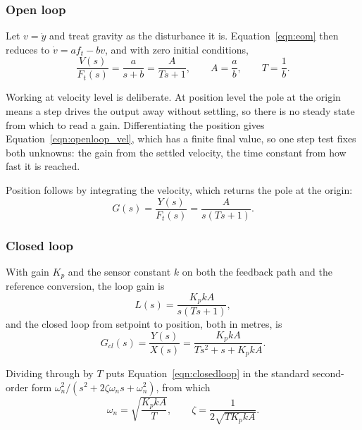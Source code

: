 \subsubsection{Open loop}
Let $v = \dot{y}$ and treat gravity as the disturbance it is. Equation~\eqref{eqn:eom} then
reduces to $\dot{v} = a f_t - b v$, and with zero initial conditions,
\begin{equation}\label{eqn:openloop_vel}
    \frac{V(s)}{F_t(s)} = \frac{a}{s + b} = \frac{A}{Ts + 1},
    \qquad A = \frac{a}{b}, \qquad T = \frac{1}{b} .
\end{equation}

Working at velocity level is deliberate. At position level the pole at the origin means a step
drives the output away without settling, so there is no steady state from which to read a gain.
Differentiating the position gives Equation~\eqref{eqn:openloop_vel}, which has a finite final
value, so one step test fixes both unknowns: the gain from the settled velocity, the time constant
from how fast it is reached.

Position follows by integrating the velocity, which returns the pole at the origin:
\begin{equation}\label{eqn:openloop_pos}
    G(s) = \frac{Y(s)}{F_t(s)} = \frac{A}{s(Ts + 1)} .
\end{equation}

\subsubsection{Closed loop}
With gain $K_p$ and the sensor constant $k$ on both the feedback path and the reference
conversion, the loop gain is
\begin{equation}\label{eqn:loopgain}
    L(s) = \frac{K_p k A}{s(Ts + 1)} ,
\end{equation}
and the closed loop from setpoint to position, both in metres, is
\begin{equation}\label{eqn:closedloop}
    G_{cl}(s) = \frac{Y(s)}{X(s)} = \frac{K_p k A}{Ts^2 + s + K_p k A} .
\end{equation}

Dividing through by $T$ puts Equation~\eqref{eqn:closedloop} in the standard second-order form
$\omega_n^2 / (s^2 + 2\zeta\omega_n s + \omega_n^2)$, from which
\begin{equation}\label{eqn:wn_zeta}
    \omega_n = \sqrt{\frac{K_p k A}{T}},
    \qquad
    \zeta = \frac{1}{2\sqrt{T K_p k A}} .
\end{equation}

